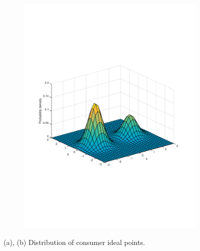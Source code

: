 \documentclass[preprint, 12pt]{elsarticle}
\begin{document}
\begin{figure}[htp!]
\begin{subfigure}[t]{0.45\textwidth}
		\includegraphics[width=\textwidth, trim={15mm 80mm 20mm 70mm}]{Graphics/distribution_mu15_nratio2.pdf}
		\caption[.]{}
		\label{fig:surface_mu15}
	\end{subfigure}
	\caption*{(a), (b) Distribution of consumer ideal points.}
	

\end{figure}
\end{document}

